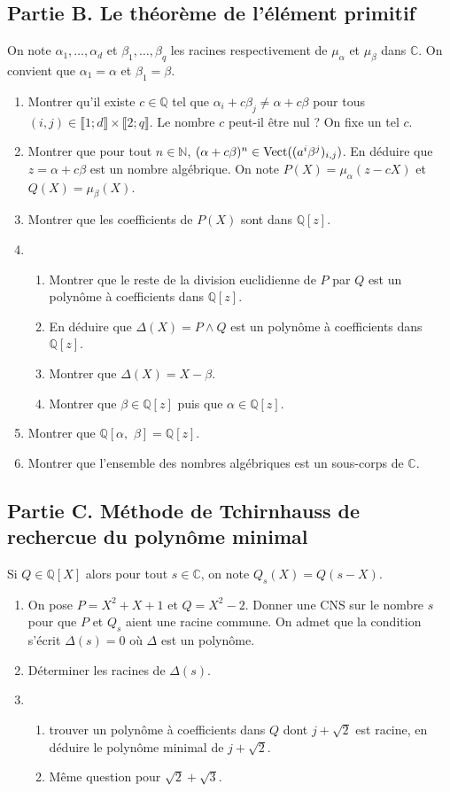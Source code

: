 \documentclass{article}
\begin{document}
\subsection{Partie B. Le théorème de l'élément primitif}
	On note $\alpha_1,\ldots,\alpha_d$ et $\beta_1,\ldots,\beta_q$ les racines respectivement de $\mu_{\alpha}$ et $\mu_{\beta}$ dans $\mathbb{C}$. On convient que $\alpha_1 = \alpha$ et $\beta_1 = \beta$.
	\begin{enumerate}
		\item Montrer qu'il existe $c\in\mathbb{Q}$ tel que $\alpha_i+c\beta_j \neq \alpha+c\beta$ pour tous $(i,j)\in\llbracket 1;d\rrbracket\times \llbracket 2;q\rrbracket$. Le nombre $c$ peut-il être nul ? On fixe un tel $c$. 
		\item Montrer que pour tout $n\in\mathbb{N}$, $(\alpha+c\beta)^n \in \textup{Vect}((a^i\beta^j)_{i,j})$. En déduire que $z=\alpha+c\beta$ est un nombre algébrique.
			On note $P(X) = \mu_{\alpha}(z-cX)$ et $Q(X) = \mu_{\beta}(X)$.
		\item Montrer que les coefficients de $P(X)$ sont dans $\mathbb{Q}[z]$.
		\item \begin{enumerate} \item Montrer que le reste de la division euclidienne de $P$ par $Q$ est un polynôme à coefficients dans $\mathbb{Q}[z]$.
			\item En déduire que $\Delta(X) = P \wedge Q$ est un polynôme à coefficients dans $\mathbb{Q}[z]$.
			\item Montrer que $\Delta(X) = X-\beta$. 
			\item Montrer que $\beta\in\mathbb{Q}[z]$ puis que $\alpha\in\mathbb{Q}[z]$.
		\end{enumerate}
	\item Montrer que $\mathbb{Q}[\alpha,\,\,\beta] = \mathbb{Q}[z]$. 
	\item Montrer que l'ensemble des nombres algébriques est un sous-corps de $\mathbb{C}$.
\end{enumerate}
\subsection{Partie C. Méthode de Tchirnhauss de rechercue du polynôme minimal}
Si $Q\in\mathbb{Q}[X]$ alors pour tout $s\in\mathbb{C}$, on note $Q_s(X) = Q(s-X)$.
\begin{enumerate}
	\item On pose $P = X^2 + X + 1$ et $Q = X^2 -2$. Donner une CNS sur le nombre $s$ pour que $P$ et $Q_s$ aient une racine commune. On admet que la condition s'écrit $\Delta(s) = 0$ où $\Delta$ est un polynôme.
	\item Déterminer les racines de $\Delta(s)$.
	\item \begin{enumerate} \item trouver un polynôme à coefficients dans $Q$ dont $j+\sqrt{2}$ est racine, en déduire le polynôme minimal de $j+\sqrt{2}$.
		\item Même question pour $\sqrt{2}+\sqrt{3}$.
	\end{enumerate}
	\end{enumerate}
\end{document}
